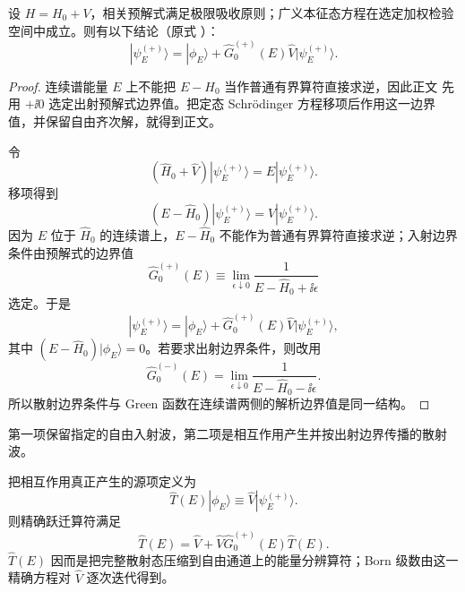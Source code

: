 \begin{proposition}[预解式构造的散射边界值方程]
设 $H=H_0+V$，相关预解式满足极限吸收原则；广义本征态方程在选定加权检验空间中成立。则有以下结论（原式 ）：
\begin{equation*}
 \boxed{
 |\psi_E^{(+)}\rangle
 =
 |\phi_E\rangle
 +\hat G_0^{(+)}(E)\hat V
 |\psi_E^{(+)}\rangle.}
\end{equation*}
\end{proposition}
\begin{proof}
连续谱能量 $E$ 上不能把 $E-H_0$ 当作普通有界算符直接求逆，因此正文 先用 $+\ii0$ 选定出射预解式边界值。把定态 Schrödinger 方程移项后作用这一边界值，并保留自由齐次解，就得到正文。



令
\begin{equation*}
 (\hat H_0+\hat V)|\psi_E^{(+)}\rangle
 =E|\psi_E^{(+)}\rangle.
\end{equation*}
移项得到
\begin{equation*}
 (E-\hat H_0)|\psi_E^{(+)}\rangle
 =\hat V|\psi_E^{(+)}\rangle.
\end{equation*}
因为 $E$ 位于 $\hat H_0$ 的连续谱上，$E-\hat H_0$ 不能作为普通有界算符直接求逆；入射边界条件由预解式的边界值
\begin{equation*}
 \hat G_0^{(+)}(E)
 \equiv
 \lim_{\epsilon\downarrow0}
 \frac{1}{E-\hat H_0+\ii\epsilon}
 \end{equation*}
选定。于是
\begin{equation*}
 {
 |\psi_E^{(+)}\rangle
 =
 |\phi_E\rangle
 +\hat G_0^{(+)}(E)\hat V
 |\psi_E^{(+)}\rangle,}
 \end{equation*}
其中 $(E-\hat H_0)|\phi_E\rangle=0$。若要求出射边界条件，则改用
\begin{equation*}
 \hat G_0^{(-)}(E)
 =
 \lim_{\epsilon\downarrow0}
 \frac{1}{E-\hat H_0-\ii\epsilon}.
\end{equation*}
所以散射边界条件与 Green 函数在连续谱两侧的解析边界值是同一结构。
\end{proof}

第一项保留指定的自由入射波，第二项是相互作用产生并按出射边界传播的散射波。

把相互作用真正产生的源项定义为
\begin{equation}
 \hat T(E)|\phi_E\rangle
 \equiv
 \hat V|\psi_E^{(+)}\rangle.
 \label{eq:T-def-r5}
\end{equation}
则精确跃迁算符满足
\begin{equation}
 \boxed{
 \hat T(E)
 =
 \hat V+\hat V\hat G_0^{(+)}(E)\hat T(E).}
 \label{eq:T-exact-r5}
\end{equation}
$\hat T(E)$ 因而是把完整散射态压缩到自由通道上的能量分辨算符；Born 级数由这一精确方程对 $\hat V$ 逐次迭代得到。

